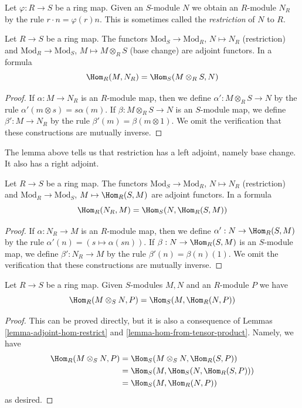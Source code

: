 \noindent
Let $\varphi : R \to S$ be a ring map. Given an $S$-module $N$ we
obtain an $R$-module $N_R$ by the rule $r \cdot n = \varphi(r)n$.
This is sometimes called the {\it restriction} of $N$ to $R$.

\begin{lemma}
\label{lemma-adjoint-tensor-restrict}
Let $R \to S$ be a ring map. The functors
$\text{Mod}_S \to \text{Mod}_R$, $N \mapsto N_R$ (restriction)
and $\text{Mod}_R \to \text{Mod}_S$, $M \mapsto M \otimes_R S$
(base change) are adjoint functors. In a formula
$$
\Hom_R(M, N_R) = \Hom_S(M \otimes_R S, N)
$$
\end{lemma}

\begin{proof}
If $\alpha : M \to N_R$ is an $R$-module map, then we define
$\alpha' : M \otimes_R S \to N$ by the rule
$\alpha'(m \otimes s) = s\alpha(m)$. If $\beta : M \otimes_R S \to N$
is an $S$-module map, we define $\beta' : M \to N_R$ by the rule
$\beta'(m) = \beta(m \otimes 1)$.
We omit the verification that these constructions are mutually inverse.
\end{proof}

\noindent
The lemma above tells us that restriction has a left adjoint, namely
base change. It also has a right adjoint.

\begin{lemma}
\label{lemma-adjoint-hom-restrict}
Let $R \to S$ be a ring map. The functors
$\text{Mod}_S \to \text{Mod}_R$, $N \mapsto N_R$ (restriction)
and $\text{Mod}_R \to \text{Mod}_S$, $M \mapsto \Hom_R(S, M)$
are adjoint functors. In a formula
$$
\Hom_R(N_R, M) = \Hom_S(N, \Hom_R(S, M))
$$
\end{lemma}

\begin{proof}
If $\alpha : N_R \to M$ is an $R$-module map, then we define
$\alpha' : N \to \Hom_R(S, M)$ by the rule
$\alpha'(n) = (s \mapsto \alpha(sn))$. If $\beta : N \to \Hom_R(S, M)$
is an $S$-module map, we define $\beta' : N_R \to M$ by the rule
$\beta'(n) = \beta(n)(1)$.
We omit the verification that these constructions are mutually inverse.
\end{proof}

\begin{lemma}
\label{lemma-hom-from-tensor-product-variant}
Let $R \to S$ be a ring map. Given $S$-modules $M, N$ and an $R$-module $P$
we have
$$
\Hom_R(M \otimes_S N, P) = \Hom_S(M, \Hom_R(N, P))
$$
\end{lemma}

\begin{proof}
This can be proved directly, but it is also a consequence of
Lemmas \ref{lemma-adjoint-hom-restrict} and \ref{lemma-hom-from-tensor-product}.
Namely, we have
\begin{align*}
\Hom_R(M \otimes_S N, P)
& =
\Hom_S(M \otimes_S N, \Hom_R(S, P)) \\
& =
\Hom_S(M, \Hom_S(N, \Hom_R(S, P))) \\
& =
\Hom_S(M, \Hom_R(N, P))
\end{align*}
as desired.
\end{proof}








